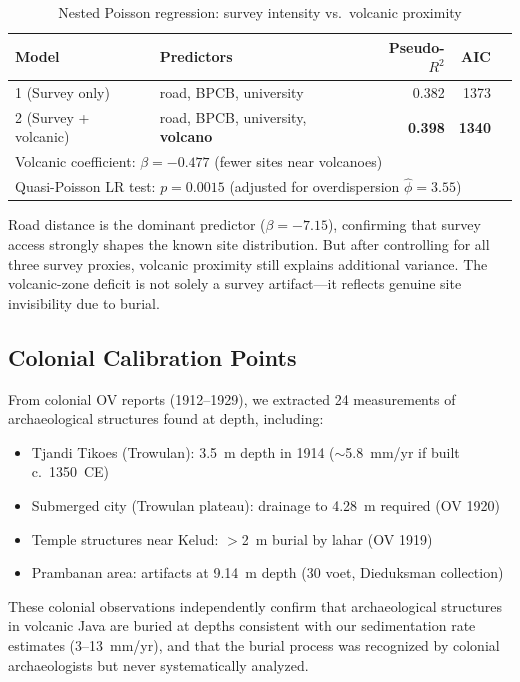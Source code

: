 \documentclass[12pt,a4paper]{article}
\begin{document}
\begin{table}[h]
\centering
\caption{Nested Poisson regression: survey intensity vs.\ volcanic proximity}
\begin{tabular}{llrrr}
\toprule
Model & Predictors & Pseudo-$R^2$ & AIC & \\
\midrule
1 (Survey only) & road, BPCB, university & 0.382 & 1373 & \\
2 (Survey + volcanic) & road, BPCB, university, \textbf{volcano} & \textbf{0.398} & \textbf{1340} & \\
\midrule
\multicolumn{4}{l}{Volcanic coefficient: $\beta=-0.477$ (fewer sites near volcanoes)} \\
\multicolumn{4}{l}{Quasi-Poisson LR test: $p=0.0015$ (adjusted for overdispersion $\hat{\phi}=3.55$)} \\
\bottomrule
\end{tabular}
\label{tab:adv3}
\end{table}

Road distance is the dominant predictor ($\beta=-7.15$), confirming that survey access strongly shapes the known site distribution. But after controlling for all three survey proxies, volcanic proximity still explains additional variance. The volcanic-zone deficit is not solely a survey artifact---it reflects genuine site invisibility due to burial.

\subsection{Colonial Calibration Points}

From colonial OV reports (1912--1929), we extracted 24 measurements of archaeological structures found at depth, including:

\begin{itemize}
    \item Tjandi Tikoes (Trowulan): 3.5~m depth in 1914 ($\sim$5.8~mm/yr if built c.\ 1350~CE)
    \item Submerged city (Trowulan plateau): drainage to 4.28~m required (OV 1920)
    \item Temple structures near Kelud: $>$2~m burial by lahar (OV 1919)
    \item Prambanan area: artifacts at 9.14~m depth (30 voet, Dieduksman collection)
\end{itemize}

These colonial observations independently confirm that archaeological structures in volcanic Java are buried at depths consistent with our sedimentation rate estimates (3--13~mm/yr), and that the burial process was recognized by colonial archaeologists but never systematically analyzed.
\end{document}
